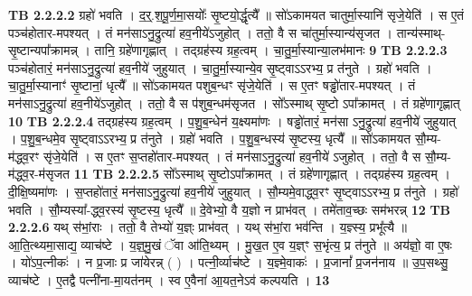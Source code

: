 \documentclass[17pt]{extarticle}
\begin{document}
                  \newline
                                \textbf{ TB 2.2.2.2} \newline
                  ग्रहो॑ भवति । द॒र्॒.श॒पू॒र्ण॒मा॒सयोः᳚ सृ॒ष्टयो॒र्द्धृत्यै᳚ ॥ सो॑ऽकामयत चातुर्मा॒स्यानि॑ सृजे॒येति॑ । स ए॒तं पञ्च॑होतार-मपश्यत् । तं मन॑साऽनु॒द्रुत्या॑ हव॒नीये॑ऽजुहोत् । ततो॒ वै स चा॑तुर्मा॒स्यान्य॑सृजत । तान्य॑स्माथ्-सृ॒ष्टान्यपा᳚क्रामन्न् । तानि॒ ग्रहे॑णागृह्णात् । तद्ग्रह॑स्य ग्रह॒त्वम् । चा॒तु॒र्मा॒स्यान्या॒लभ॑मानः \textbf{ 9} \newline
                  \newline
                                \textbf{ TB 2.2.2.3} \newline
                  पञ्च॑होतारं॒ मन॑साऽनु॒द्रुत्या॑ हव॒नीये॑ जुहुयात् । चा॒तु॒र्मा॒स्यान्ये॒व सृ॒ष्ट्वाऽऽरभ्य॒ प्र त॑नुते । ग्रहो॑ भवति । चा॒तु॒र्मा॒स्यानाꣳ॑ सृ॒ष्टानां॒ धृत्यै᳚ ॥ सो॑ऽकामयत पशुब॒न्धꣳ सृ॑जे॒येति॑ । स ए॒तꣳ षड्ढो॑तार-मपश्यत् । तं मन॑साऽनु॒द्रुत्या॑ हव॒नीये॑ऽजुहोत् । ततो॒ वै स प॑शुब॒न्धम॑सृजत । सो᳚ऽस्माथ् सृ॒ष्टो ऽपा᳚क्रामत् । तं ग्रहे॑णागृह्णात् \textbf{ 10} \newline
                  \newline
                                \textbf{ TB 2.2.2.4} \newline
                  तद्ग्रह॑स्य ग्रह॒त्वम् । प॒शु॒ब॒न्धेन॑ य॒क्ष्यमा॑णः । षड्ढो॑तारं॒ मन॑सा ऽनु॒द्रुत्या॑ हव॒नीये॑ जुहुयात् । प॒शु॒ब॒न्धमे॒व सृ॒ष्ट्वाऽऽरभ्य॒ प्र त॑नुते । ग्रहो॑ भवति । प॒शु॒ब॒न्धस्य॑ सृ॒ष्टस्य॒ धृत्यै᳚ ॥ सो॑ऽकामयत सौ॒म्य-म॑द्ध्व॒रꣳ सृ॑जे॒येति॑ । स ए॒तꣳ स॒प्तहो॑तार-मपश्यत् । तं मन॑साऽनु॒द्रुत्या॑ हव॒नीये॑ ऽजुहोत् । ततो॒ वै स सौ॒म्य-म॑द्ध्व॒र-म॑सृजत \textbf{ 11} \newline
                  \newline
                                \textbf{ TB 2.2.2.5} \newline
                  सो᳚ऽस्माथ् सृ॒ष्टोऽपा᳚क्रामत् । तं ग्रहे॑णागृह्णात् । तद्ग्रह॑स्य ग्रह॒त्वम् । दी॒क्षि॒ष्यमा॑णः । स॒प्तहो॑तारं॒ मन॑साऽनु॒द्रुत्या॑ हव॒नीये॑ जुहुयात् । सौ॒म्यमे॒वाद्ध्व॒रꣳ सृ॒ष्ट्वाऽऽरभ्य॒ प्र त॑नुते । ग्रहो॑ भवति । सौ॒म्यस्या᳚-द्ध्व॒रस्य॑ सृ॒ष्टस्य॒ धृत्यै᳚ ॥ दे॒वेभ्यो॒ वै य॒ज्ञो न प्राभ॑वत् । तमे॑ताव॒च्छः सम॑भरन्न् \textbf{ 12} \newline
                  \newline
                                \textbf{ TB 2.2.2.6} \newline
                  यथ् स॑भां॒राः । ततो॒ वै तेभ्यो॑ य॒ज्ञ्ः प्राभ॑वत् । यथ् स॑भां॒रा भव॑न्ति । य॒ज्ञ्स्य॒ प्रभू᳚त्यै ॥ आ॒ति॒त्थ्यमा॒साद्य॒ व्याच॑ष्टे । य॒ज्ञ्॒मु॒खं ॅवा आ॑ति॒थ्यम् । मु॒ख॒त ए॒व य॒ज्ञ्ꣳ स॒भृंत्य॒ प्र त॑नुते ॥ अय॑ज्ञो॒ वा ए॒षः । यो॑ऽप॒त्नीकः॑ । न प्र॒जाः प्र जा॑येरन्न् ( ) । पत्नी॒र्व्याच॑ष्टे । य॒ज्ञ्मे॒वाकः॑ । प्र॒जानां᳚ प्र॒जन॑नाय ॥ उ॒प॒सथ्सु॒ व्याच॑ष्टे । ए॒तद्वै पत्नी॑ना-मा॒यत॑नम् । स्व ए॒वैना॑ आ॒यत॒नेऽव॑ कल्पयति । \textbf{ 13} \newline
\end{document}
